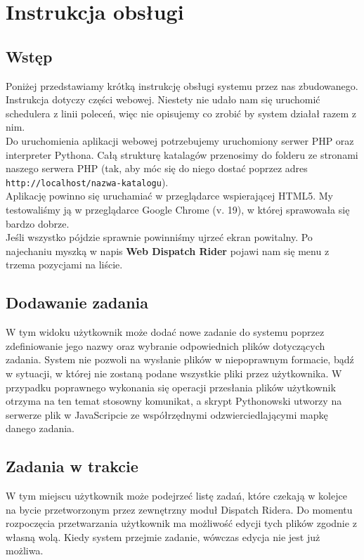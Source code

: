 \chapter{Instrukcja obsługi}
\section{Wstęp}
Poniżej przedstawiamy krótką instrukcję obsługi systemu przez nas zbudowanego.
Instrukcja dotyczy części webowej. Niestety nie udało nam się uruchomić schedulera z linii
poleceń, więc nie opisujemy co zrobić by system działał razem z nim.
\\
Do uruchomienia aplikacji webowej potrzebujemy uruchomiony serwer PHP oraz interpreter Pythona.
Całą strukturę katalagów przenosimy do folderu ze stronami naszego serwera PHP (tak, aby móc
się do niego dostać poprzez adres \texttt{http://localhost/nazwa-katalogu}).
\\
Aplikację powinno się uruchamiać w przeglądarce wspierającej HTML5. My testowaliśmy ją w przeglądarce
Google Chrome (v. 19), w której sprawowała się bardzo dobrze.
\\
Jeśli wszystko pójdzie sprawnie powinniśmy ujrzeć ekran powitalny. Po najechaniu myszką w napis
\textbf{Web Dispatch Rider} pojawi nam się menu z trzema pozycjami na liście.

\section{Dodawanie zadania}
W tym widoku użytkownik może dodać nowe zadanie do systemu poprzez zdefiniowanie jego nazwy
oraz wybranie odpowiednich plików dotyczących zadania. System nie pozwoli na wysłanie plików
w niepoprawnym formacie, bądź w sytuacji, w której nie zostaną podane wszystkie pliki
przez użytkownika. W przypadku poprawnego wykonania się operacji przesłania plików
użytkownik otrzyma na ten temat stosowny komunikat, a skrypt Pythonowski utworzy na serwerze
plik w JavaScripcie ze współrzędnymi odzwierciedlającymi mapkę danego zadania.

\section{Zadania w trakcie}
W tym miejscu użytkownik może podejrzeć listę zadań, które czekają w kolejce na bycie przetworzonym
przez zewnętrzny moduł Dispatch Ridera. Do momentu rozpoczęcia przetwarzania użytkownik ma możliwość
edycji tych plików zgodnie z własną wolą. Kiedy system przejmie zadanie, wówczas edycja nie jest już
możliwa.

